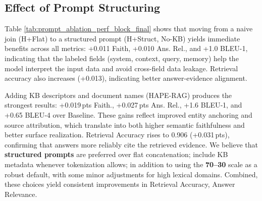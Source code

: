\documentclass[10pt,twocolumn,letterpaper]{article}
\begin{document}
\subsection{Effect of Prompt Structuring}

Table \ref{tab:prompt_ablation_perf_block_final} shows that moving from a naive join (H+Flat) to a structured prompt (H+Struct, No-KB) yields immediate benefits across all metrics: +0.011 Faith, +0.010 Ans. Rel., and +1.0 BLEU-1, indicating that the labeled fields (system, context, query, memory) help the model interpret the input data and avoid cross-field data leakage. Retrieval accuracy also increases (+0.013), indicating better answer-evidence alignment.

\vspace{0.5em}
Adding KB descriptors and document names (HAPE‑RAG) produces the strongest results: +0.019\,pts Faith., +0.027\,pts Ans. Rel., +1.6 BLEU‑1, and +0.65 BLEU‑4 over Baseline. These gains reflect improved entity anchoring and source attribution, which translate into both higher semantic faithfulness and better surface realization. Retrieval Accuracy rises to 0.906 (+0.031\,pts), confirming that answers more reliably cite the retrieved evidence. We believe that \textbf{structured prompts} are preferred over flat concatenation; include KB metadata whenever tokenization allows; in addition to using the \textbf{70--30} scale as a robust default, with some minor adjustments for high lexical domains. Combined, these choices yield consistent improvements in Retrieval Accuracy, Answer Relevance.
\end{document}
